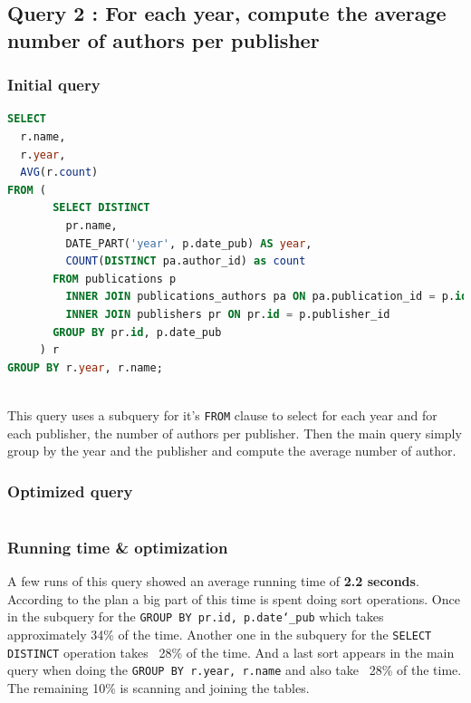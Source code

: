 \documentclass[doubleside, titlepage]{article}
\begin{document}
\subsection{Query 2 : For each year, compute the average number of authors per publisher}

\subsubsection{Initial query}
		\begin{lstlisting}[language=SQL,showspaces=false,basicstyle=\ttfamily,numberstyle=\tiny,commentstyle=\color{gray}]
SELECT
  r.name,
  r.year,
  AVG(r.count)
FROM (
       SELECT DISTINCT
         pr.name,
         DATE_PART('year', p.date_pub) AS year,
         COUNT(DISTINCT pa.author_id) as count
       FROM publications p
         INNER JOIN publications_authors pa ON pa.publication_id = p.id
         INNER JOIN publishers pr ON pr.id = p.publisher_id
       GROUP BY pr.id, p.date_pub
     ) r
GROUP BY r.year, r.name;
		\end{lstlisting}
~\\	
This query uses a subquery for it's \texttt{FROM} clause to select for each year and for each publisher, the number of authors per publisher. Then the main query simply group by the year and the publisher and compute the average number of author.~\\

\subsubsection{Optimized query}
		\begin{lstlisting}[language=SQL,showspaces=false,basicstyle=\ttfamily,numberstyle=\tiny,commentstyle=\color{gray}]

		\end{lstlisting}
		
\subsubsection{Running time \& optimization}

A few runs of this query showed an average running time of \textbf{2.2 seconds}. According to the plan a big part of this time is spent doing sort operations. Once in the subquery for the \texttt{GROUP BY pr.id, p.date\char`_pub} which takes approximately 34\% of the time. Another one in the subquery for the \texttt{SELECT DISTINCT} operation takes ~28\% of the time. And a last sort appears in the main query when doing the \texttt{GROUP BY r.year, r.name} and also take ~28\% of the time. The remaining 10\% is scanning and joining the tables.
\end{document}
